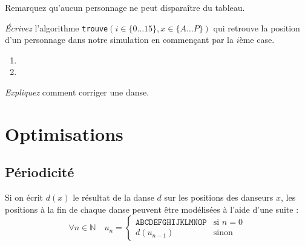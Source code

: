 Remarquez qu'aucun personnage ne peut disparaître du tableau.
\begin{exo}
\emph{Écrivez} l'algorithme
\texttt{trouve}$(i\in\{0\dots15\}, x\in\{A\dots P\})$ qui retrouve la position
d'un personnage dans notre simulation en commençant par la $i$ème case.
\begin{enumerate}
\item {}
\item {}
\end{enumerate}
\end{exo}
\begin{exo}[Préparation]
	\emph{Expliquez} comment corriger une danse. 
\end{exo}

\section{Optimisations}
\begin{comment}
Grâce à vous, Noël se passera bien pour notre ami.
Il nous doit une \emph{reconnaissance éternelle}
mais il a encore un <<~petit quelque chose~>> à nous demander.

Il a entendu dire que
Sa~Majesté se lassait de tout ça et qu'elle avait décidé de changer les règles :
pendant le prochain milliard d'années (ils vivent tous très longtemps mais la
principale cause de mortalité est la décapitation), l'Élu
(qu'Elle essaiera de ne pas exécuter entre-temps, Elle fera un effort)
participera à sa place et ils reprendront du même endroit l'année suivante.
La danse ne changera pas (quel intérêt si Elle ne regarde pas ?).
Le chorégraphe doit maintenant prédire la position exacte des danseurs après
tout ce temps. S'il se trompe, il sera exécuté, lui et toute sa famille.
\end{comment}

\subsection{Périodicité}
Si on écrit $d(x)$ le résultat de la danse $d$ sur les positions des danseurs
$x$, les positions à la fin de chaque danse peuvent être modélisées à l'aide
d'une suite :\[
	\forall n \in \mathbb{N} \quad u_n =
	\left\{\begin{array}{ll}
		\texttt{ABCDEFGHIJKLMNOP} & \text{si $n=0$} \\
		d\left(u_{n-1}\right) & \text{sinon}
	\end{array}\right.
\]


